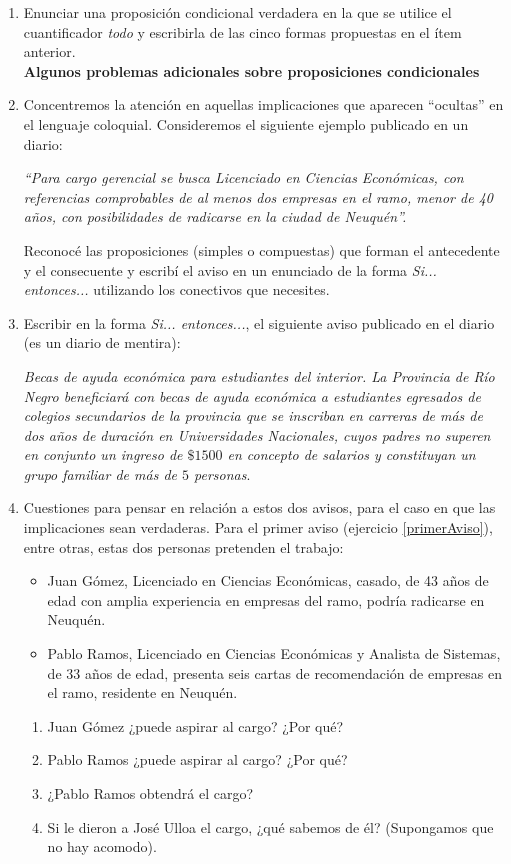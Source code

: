 \documentclass[12pt]{article}
\theoremstyle{definition}
\theoremstyle{remark}
\begin{document}
\begin{enumerate}
\item Enunciar una proposición condicional verdadera en la que se  utilice el cuantificador \textit{todo} y escribirla de las cinco formas propuestas en el ítem anterior.\\

\textbf{Algunos problemas adicionales sobre proposiciones condicionales}

\item \label{primerAviso} Concentremos la atención en aquellas implicaciones que aparecen “ocultas” en el lenguaje coloquial. Consideremos el siguiente ejemplo publicado en un diario:
 
\textit{ “Para cargo gerencial se busca Licenciado en Ciencias Económicas, con referencias comprobables de al menos dos empresas en el ramo, menor de 40 años, con posibilidades de radicarse en la ciudad de Neuquén”.}

Reconocé las proposiciones (simples o compuestas) que forman el antecedente y el consecuente y escribí el aviso en un enunciado de la forma \textit{Si... entonces...} utilizando los conectivos que necesites.

\item Escribir en la forma \textit{Si... entonces...}, el siguiente aviso publicado en el diario (es un diario de mentira):

\textit{Becas de ayuda económica para estudiantes del interior. La Provincia de Río Negro beneficiará con becas de ayuda económica a estudiantes egresados de colegios secundarios de la provincia que se inscriban en carreras de más de dos años de duración en Universidades Nacionales, cuyos padres no superen en conjunto un ingreso de $\$1500$ en concepto de salarios y constituyan un grupo familiar de más de $5$ personas}.

\item Cuestiones para pensar en relación a estos dos avisos, para el caso en que las implicaciones sean verdaderas. Para el primer aviso (ejercicio \ref{primerAviso}), entre otras, estas dos personas pretenden el trabajo:
\begin{itemize}
\item Juan Gómez, Licenciado en Ciencias Económicas, casado, de 43 años de edad con amplia experiencia en empresas del ramo, podría radicarse en Neuquén.
\item Pablo Ramos, Licenciado en Ciencias Económicas y Analista de Sistemas, de 33 años de edad, presenta seis cartas de recomendación de empresas en el ramo, residente en Neuquén. 
\end{itemize}
\begin{enumerate}
\setlength\itemsep{0em}
\item Juan Gómez ¿puede aspirar al cargo? ¿Por qué?
\item Pablo Ramos ¿puede aspirar al cargo? ¿Por qué?
\item ¿Pablo Ramos obtendrá el cargo?
\item Si le dieron a José Ulloa el cargo, ¿qué sabemos de él? (Supongamos que no hay acomodo).
\end{enumerate}
 

\end{enumerate}
\end{document}
